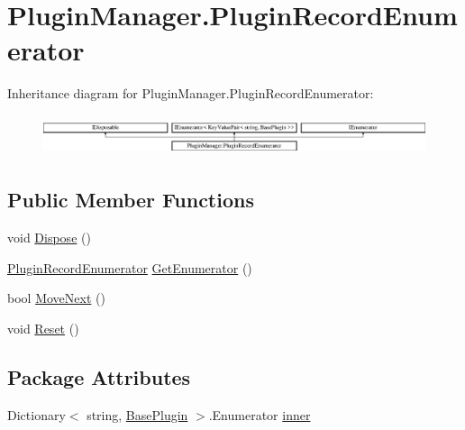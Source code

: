 \hypertarget{structOTA_1_1PluginManager_1_1PluginRecordEnumerator}{}\section{Plugin\+Manager.\+Plugin\+Record\+Enumerator}
\label{structOTA_1_1PluginManager_1_1PluginRecordEnumerator}
Inheritance diagram for Plugin\+Manager.\+Plugin\+Record\+Enumerator\+:\begin{figure}[H]
\begin{center}
\leavevmode
\includegraphics[height=1.196581cm]{structOTA_1_1PluginManager_1_1PluginRecordEnumerator}
\end{center}
\end{figure}
\subsection*{Public Member Functions}
\begin{DoxyCompactItemize}
\item 
void \hyperlink{structOTA_1_1PluginManager_1_1PluginRecordEnumerator_a6e2d745cdb7a7b983f861ed6a9a541a7}{Dispose} ()
\item 
\hyperlink{structOTA_1_1PluginManager_1_1PluginRecordEnumerator}{Plugin\+Record\+Enumerator} \hyperlink{structOTA_1_1PluginManager_1_1PluginRecordEnumerator_a5cf8c22048c6f0fe31d1e25ecf9503a5}{Get\+Enumerator} ()
\item 
bool \hyperlink{structOTA_1_1PluginManager_1_1PluginRecordEnumerator_ad5316c283894d57be1450edab878aed0}{Move\+Next} ()
\item 
void \hyperlink{structOTA_1_1PluginManager_1_1PluginRecordEnumerator_a372de693ad40b3f42839c8ec6ac845f4}{Reset} ()
\end{DoxyCompactItemize}
\subsection*{Package Attributes}
\begin{DoxyCompactItemize}
\item 
Dictionary$<$ string, \hyperlink{classOTA_1_1Plugin_1_1BasePlugin}{Base\+Plugin} $>$.Enumerator \hyperlink{structOTA_1_1PluginManager_1_1PluginRecordEnumerator_acc294317d4e73bffc4325d250d40bf0d}{inner}
\end{DoxyCompactItemize}
